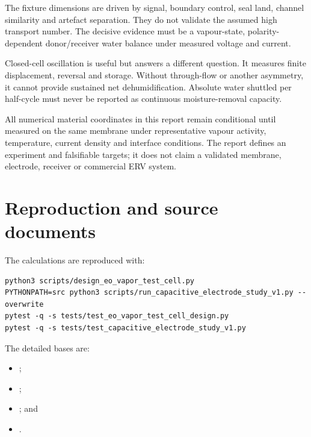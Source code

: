 \documentclass[10pt,a4paper]{article}
\begin{document}
The fixture dimensions are driven by signal, boundary control, seal land,
channel similarity and artefact separation. They do not validate the assumed
high transport number. The decisive evidence must be a vapour-state,
polarity-dependent donor/receiver water balance under measured voltage and
current.

Closed-cell oscillation is useful but answers a different question. It measures
finite displacement, reversal and storage. Without through-flow or another
asymmetry, it cannot provide sustained net dehumidification. Absolute water
shuttled per half-cycle must never be reported as continuous moisture-removal
capacity.

\begin{warningbox}
All numerical material coordinates in this report remain conditional until
measured on the same membrane under representative vapour activity,
temperature, current density and interface conditions. The report defines an
experiment and falsifiable targets; it does not claim a validated membrane,
electrode, receiver or commercial ERV system.
\end{warningbox}

\section*{Reproduction and source documents}

The calculations are reproduced with:
\begin{verbatim}
python3 scripts/design_eo_vapor_test_cell.py
PYTHONPATH=src python3 scripts/run_capacitive_electrode_study_v1.py --overwrite
pytest -q -s tests/test_eo_vapor_test_cell_design.py
pytest -q -s tests/test_capacitive_electrode_study_v1.py
\end{verbatim}

The detailed bases are:
\begin{itemize}
\item {};
\item {};
\item {}; and
\item {}.
\end{itemize}
\end{document}
